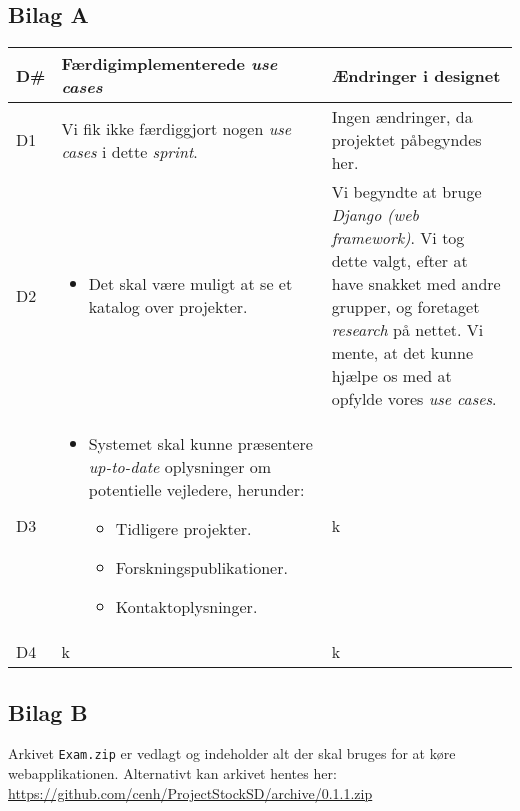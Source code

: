 \documentclass[12pt]{article}
\begin{document}
\subsection{Bilag A}
\label{sec:bilagA}
\begin{center}
	\begin{tabular}{|p{}|p{}|p{}|}
		\hline
	\textbf{D\#} & \textbf{Færdigimplementerede \textit{use cases}} & \textbf{Ændringer i designet} \\ \hline

	D1 & Vi fik ikke færdiggjort nogen \textit{use cases} i dette \textit{sprint}. & Ingen ændringer, da projektet påbegyndes her. \\ \hline

	D2 & 		\begin{minipage}[t]{0.4\textwidth}
	\begin{itemize}
		\item Det skal være muligt at se et katalog over projekter.
		\end{itemize}
		\end{minipage} & Vi begyndte at bruge \textit{Django (web framework)}. Vi tog dette valgt, efter at have snakket med andre grupper, og foretaget \textit{research} på nettet. Vi mente, at det kunne hjælpe os med at opfylde vores \textit{use cases}. \\ \hline

	D3 &
	\begin{minipage}[t]{0.4\textwidth}
	\begin{itemize}
		\item Systemet skal kunne præsentere \textit{up-to-date} oplysninger om potentielle vejledere, herunder:
		\begin{itemize}
			\item Tidligere projekter.
			\item Forskningspublikationer.
			\item Kontaktoplysninger.
		\end{itemize}
	\end{itemize}
	\end{minipage} & k \\
		\hline
	D4 & k & k \\ \hline
	\end{tabular}
\end{center}


\subsection{Bilag B}
\label{sec:bilagB}
Arkivet \texttt{Exam.zip} er vedlagt og indeholder alt der skal bruges for at køre webapplikationen.
Alternativt kan arkivet hentes her:\\
\url{https://github.com/cenh/ProjectStockSD/archive/0.1.1.zip}
\end{document}
